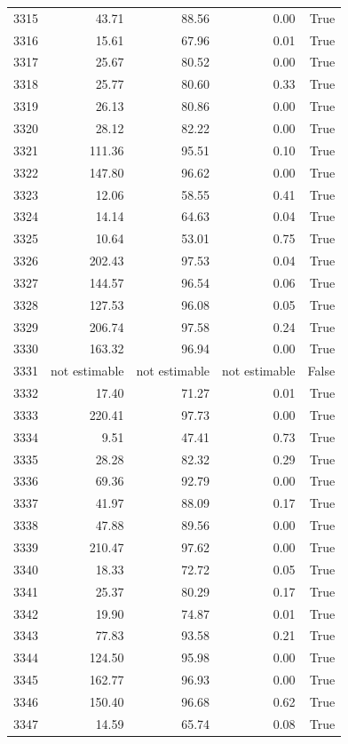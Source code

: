 \begin{longtable}{rrrrr}
3315 & 43.71 & 88.56 & 0.00 & True \\
3316 & 15.61 & 67.96 & 0.01 & True \\
3317 & 25.67 & 80.52 & 0.00 & True \\
3318 & 25.77 & 80.60 & 0.33 & True \\
3319 & 26.13 & 80.86 & 0.00 & True \\
3320 & 28.12 & 82.22 & 0.00 & True \\
3321 & 111.36 & 95.51 & 0.10 & True \\
3322 & 147.80 & 96.62 & 0.00 & True \\
3323 & 12.06 & 58.55 & 0.41 & True \\
3324 & 14.14 & 64.63 & 0.04 & True \\
3325 & 10.64 & 53.01 & 0.75 & True \\
3326 & 202.43 & 97.53 & 0.04 & True \\
3327 & 144.57 & 96.54 & 0.06 & True \\
3328 & 127.53 & 96.08 & 0.05 & True \\
3329 & 206.74 & 97.58 & 0.24 & True \\
3330 & 163.32 & 96.94 & 0.00 & True \\
3331 & not estimable & not estimable & not estimable & False \\
3332 & 17.40 & 71.27 & 0.01 & True \\
3333 & 220.41 & 97.73 & 0.00 & True \\
3334 & 9.51 & 47.41 & 0.73 & True \\
3335 & 28.28 & 82.32 & 0.29 & True \\
3336 & 69.36 & 92.79 & 0.00 & True \\
3337 & 41.97 & 88.09 & 0.17 & True \\
3338 & 47.88 & 89.56 & 0.00 & True \\
3339 & 210.47 & 97.62 & 0.00 & True \\
3340 & 18.33 & 72.72 & 0.05 & True \\
3341 & 25.37 & 80.29 & 0.17 & True \\
3342 & 19.90 & 74.87 & 0.01 & True \\
3343 & 77.83 & 93.58 & 0.21 & True \\
3344 & 124.50 & 95.98 & 0.00 & True \\
3345 & 162.77 & 96.93 & 0.00 & True \\
3346 & 150.40 & 96.68 & 0.62 & True \\
3347 & 14.59 & 65.74 & 0.08 & True \\

\end{longtable}
